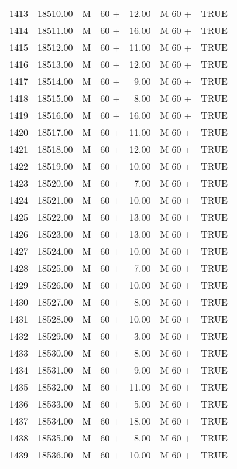 \begin{table}[ht]
\begin{tabular}{rrllrll}
  1413 & 18510.00 & M & 60 + & 12.00 & M 60 + & TRUE \\ 
  1414 & 18511.00 & M & 60 + & 16.00 & M 60 + & TRUE \\ 
  1415 & 18512.00 & M & 60 + & 11.00 & M 60 + & TRUE \\ 
  1416 & 18513.00 & M & 60 + & 12.00 & M 60 + & TRUE \\ 
  1417 & 18514.00 & M & 60 + & 9.00 & M 60 + & TRUE \\ 
  1418 & 18515.00 & M & 60 + & 8.00 & M 60 + & TRUE \\ 
  1419 & 18516.00 & M & 60 + & 16.00 & M 60 + & TRUE \\ 
  1420 & 18517.00 & M & 60 + & 11.00 & M 60 + & TRUE \\ 
  1421 & 18518.00 & M & 60 + & 12.00 & M 60 + & TRUE \\ 
  1422 & 18519.00 & M & 60 + & 10.00 & M 60 + & TRUE \\ 
  1423 & 18520.00 & M & 60 + & 7.00 & M 60 + & TRUE \\ 
  1424 & 18521.00 & M & 60 + & 10.00 & M 60 + & TRUE \\ 
  1425 & 18522.00 & M & 60 + & 13.00 & M 60 + & TRUE \\ 
  1426 & 18523.00 & M & 60 + & 13.00 & M 60 + & TRUE \\ 
  1427 & 18524.00 & M & 60 + & 10.00 & M 60 + & TRUE \\ 
  1428 & 18525.00 & M & 60 + & 7.00 & M 60 + & TRUE \\ 
  1429 & 18526.00 & M & 60 + & 10.00 & M 60 + & TRUE \\ 
  1430 & 18527.00 & M & 60 + & 8.00 & M 60 + & TRUE \\ 
  1431 & 18528.00 & M & 60 + & 10.00 & M 60 + & TRUE \\ 
  1432 & 18529.00 & M & 60 + & 3.00 & M 60 + & TRUE \\ 
  1433 & 18530.00 & M & 60 + & 8.00 & M 60 + & TRUE \\ 
  1434 & 18531.00 & M & 60 + & 9.00 & M 60 + & TRUE \\ 
  1435 & 18532.00 & M & 60 + & 11.00 & M 60 + & TRUE \\ 
  1436 & 18533.00 & M & 60 + & 5.00 & M 60 + & TRUE \\ 
  1437 & 18534.00 & M & 60 + & 18.00 & M 60 + & TRUE \\ 
  1438 & 18535.00 & M & 60 + & 8.00 & M 60 + & TRUE \\ 
  1439 & 18536.00 & M & 60 + & 10.00 & M 60 + & TRUE \\ 

\end{tabular}
\end{table}
